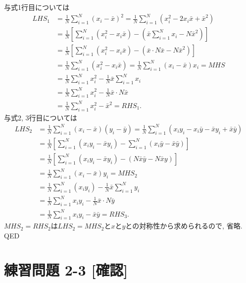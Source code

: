 \documentclass[
]{book}
\begin{document}
与式1行目については
\[
\begin{aligned}
    LHS_1 &= \frac{1}{N}\sum_{i=1}^N (x_i-\bar{x})^2 = \frac{1}{N}\sum_{i=1}^N (x_i^2 - 2x_i\bar{x}+\bar{x}^2) \\
          &= \frac{1}{N}\left[\sum_{i=1}^N (x_i^2-x_i\bar{x})-\left(\bar{x}\sum_{i=1}^N x_i-N\bar{x}^2\right)\right] \\
          &= \frac{1}{N}\left[\sum_{i=1}^N (x_i^2-x_i\bar{x})-\left(\bar{x}\cdot N\bar{x}-N\bar{x}^2\right)\right] \\
          &= \frac{1}{N}\sum_{i=1}^N (x_i^2-x_i\bar{x}) = \frac{1}{N}\sum_{i=1}^N (x_i-\bar{x})x_i = MHS \\
          &= \frac{1}{N}\sum_{i=1}^N x_i^2 - \frac{1}{N}\bar{x}\sum_{i=1}^N x_i \\
          &= \frac{1}{N}\sum_{i=1}^N x_i^2 - \frac{1}{N}\bar{x}\cdot N\bar{x} \\
          &= \frac{1}{N}\sum_{i=1}^N x_i^2 - \bar{x}^2 = RHS_1.
\end{aligned}
\]
与式2, 3行目については
\[
\begin{aligned}
    LHS_2 &= \frac{1}{N}\sum_{i=1}^N (x_i-\bar{x})(y_i - \bar{y}) = \frac{1}{N}\sum_{i=1}^N (x_iy_i - x_i\bar{y} - \bar{x}y_i + \bar{x}\bar{y}) \\
          &= \frac{1}{N}\left[\sum_{i=1}^N (x_iy_i - \bar{x}y_i) - \sum_{i=1}^N (x_i\bar{y} - \bar{x}\bar{y})\right] \\
          &= \frac{1}{N}\left[\sum_{i=1}^N (x_iy_i - \bar{x}y_i) - (N\bar{x}\bar{y} - N\bar{x}{y})\right] \\
          &= \frac{1}{N}\sum_{i=1}^N (x_i-\bar{x})y_i = MHS_2 \\
          &= \frac{1}{N}\sum_{i=1}^N (x_iy_i) - \frac{1}{N}\bar{x}\sum_{i=1}^N y_i \\
          &= \frac{1}{N}\sum_{i=1}^N x_iy_i - \frac{1}{N}\bar{x}\cdot N\bar{y} \\
          &= \frac{1}{N}\sum_{i=1}^N x_iy_i - \bar{x}\bar{y} = RHS_3.
\end{aligned}
\]
\(MHS_2 = RHS_2\)は\(LHS_2 = MHS_2\)と\(x\)と\(y\)との対称性から求められるので, 省略. QED

\hypertarget{ux7df4ux7fd2ux554fux984c-2-3-ux78baux8a8d}{%
\section*{練習問題 2-3 {[}確認{]}}\label{ux7df4ux7fd2ux554fux984c-2-3-ux78baux8a8d}}
\end{document}

